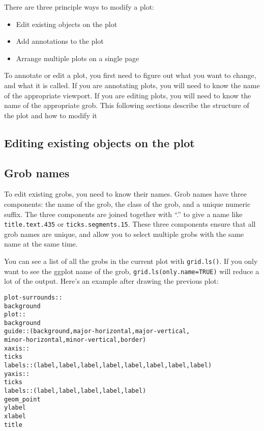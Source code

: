 There are three principle ways to modify a plot:

\begin{itemize}
  \item Edit existing objects on the plot
  \item Add annotations to the plot
  \item Arrange multiple plots on a single page
\end{itemize}

To annotate or edit a plot, you first need to figure out what you want to change, and what it is called.  If you are annotating plots, you will need to know the name of the appropriate viewport.  If you are editing plots, you will need to know the name of the appropriate grob.  This following sections describe the structure of the plot and how to modify it

\subsection{Editing existing objects on the plot}

\subsection{Grob names}

To edit existing grobs, you need to know their names.  Grob names have three components: the name of the grob, the class of the grob, and a unique numeric suffix.  The three components are joined together with ``.'' to give a name like {\tt title.text.435} or {\tt ticks.segments.15}.  These three components ensure that all grob names are unique, and allow you to select multiple grobs with the same name at the same time.


You can see a list of all the grobs in the current plot with {\tt grid.ls()}.  If you only want to see the ggplot name of the grob, {\tt grid.ls(only.name=TRUE)} will reduce a lot of the output.  Here's an example after drawing the previous plot:

\begin{alltt}
plot-surrounds::
 background
 plot::
  background
  guide:: (background, major-horizontal, major-vertical, 
           minor-horizontal, minor-vertical, border)
  xaxis::
   ticks
   labels:: (label, label, label, label, label, label, label, label)
  yaxis::
   ticks
   labels:: (label, label, label, label, label)
  geom_point
 ylabel
 xlabel
 title
\end{alltt}


